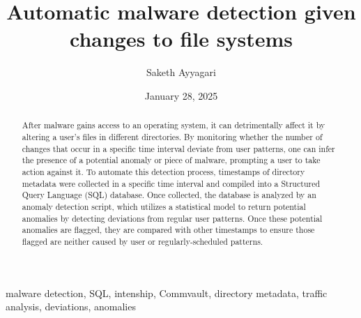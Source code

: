 \documentclass[12pt,conference,onecolumn]{IEEEtran}
\title{Automatic malware detection given changes to file systems}
\author{Saketh Ayyagari}
\date{January 28, 2025}
\newcommand{\keywords}{malware detection, SQL, intenship, Commvault, directory metadata, traffic analysis, deviations, anomalies}
\begin{document}
\maketitle 

\begin{abstract}
After malware gains access to an operating system, it can detrimentally affect it by altering a user's files in different directories. By monitoring whether the number of changes that occur in a specific time interval deviate from user patterns, one can infer the presence of a potential anomaly or piece of malware, prompting a user to take action against it. To automate this detection process, timestamps of directory metadata were collected in a specific time interval and compiled into a Structured Query Language (SQL) database. Once collected, the database is analyzed by an anomaly detection script, which utilizes a statistical model to return potential anomalies by detecting deviations from regular user patterns. Once these potential anomalies are flagged, they are compared with other timestamps to ensure those flagged are neither caused by user or regularly-scheduled patterns. 
\end{abstract}

\begin{IEEEkeywords}
\keywords
\end{IEEEkeywords}
\end{document}
